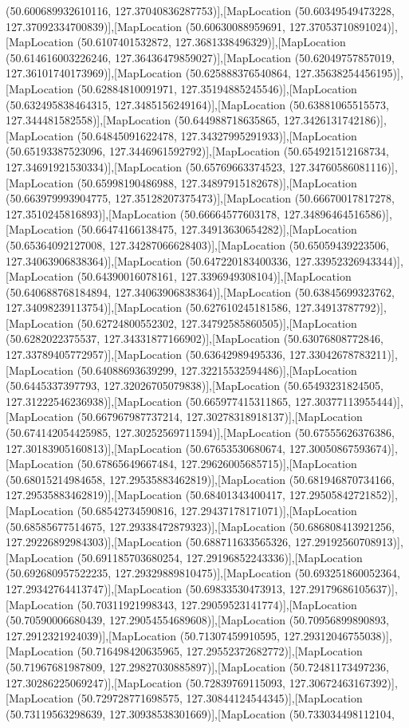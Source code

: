 (50.600689932610116, 127.37040836287753)],[MapLocation (50.60349549473228, 127.37092334700839)],[MapLocation (50.60630088959691, 127.37053710891024)],[MapLocation (50.6107401532872, 127.3681338496329)],[MapLocation (50.614616003226246, 127.36436479859027)],[MapLocation (50.62049757857019, 127.36101740173969)],[MapLocation (50.625888376540864, 127.35638254456195)],[MapLocation (50.62884810091971, 127.35194885245546)],[MapLocation (50.632495838464315, 127.3485156249164)],[MapLocation (50.63881065515573, 127.344481582558)],[MapLocation (50.644988718635865, 127.3426131742186)],[MapLocation (50.64845091622478, 127.34327995291933)],[MapLocation (50.65193387523096, 127.3446961592792)],[MapLocation (50.654921512168734, 127.34691921530334)],[MapLocation (50.65769663374523, 127.34760586081116)],[MapLocation (50.65998190486988, 127.34897915182678)],[MapLocation (50.663979993904775, 127.35128207375473)],[MapLocation (50.66670017817278, 127.3510245816893)],[MapLocation (50.66664577603178, 127.34896464516586)],[MapLocation (50.66474166138475, 127.34913630654282)],[MapLocation (50.65364092127008, 127.34287066628403)],[MapLocation (50.65059439223506, 127.34063906838364)],[MapLocation (50.647220183400336, 127.33952326943344)],[MapLocation (50.64390016078161, 127.3396949308104)],[MapLocation (50.640688768184894, 127.34063906838364)],[MapLocation (50.63845699323762, 127.34098239113754)],[MapLocation (50.627610245181586, 127.34913787792)],[MapLocation (50.62724800552302, 127.34792585860505)],[MapLocation (50.6282022375537, 127.34331877166902)],[MapLocation (50.63076808772846, 127.33789405772957)],[MapLocation (50.63642989495336, 127.33042678783211)],[MapLocation (50.64088693639299, 127.32215532594486)],[MapLocation (50.6445337397793, 127.32026705079838)],[MapLocation (50.65493231824505, 127.31222546236938)],[MapLocation (50.665977415311865, 127.30377113955444)],[MapLocation (50.667967987737214, 127.30278318918137)],[MapLocation (50.674142054425985, 127.30252569711594)],[MapLocation (50.67555626376386, 127.30183905160813)],[MapLocation (50.67653530680674, 127.30050867593674)],[MapLocation (50.67865649667484, 127.29626005685715)],[MapLocation (50.68015214984658, 127.29535883462819)],[MapLocation (50.681946870734166, 127.29535883462819)],[MapLocation (50.68401343400417, 127.29505842721852)],[MapLocation (50.68542734590816, 127.29437178171071)],[MapLocation (50.68585677514675, 127.29338472879323)],[MapLocation (50.686808413921256, 127.29226892984303)],[MapLocation (50.688711633565326, 127.29192560708913)],[MapLocation (50.691185703680254, 127.29196852243336)],[MapLocation (50.692680957522235, 127.29329889810475)],[MapLocation (50.693251860052364, 127.29342764413747)],[MapLocation (50.69833530473913, 127.29179686105637)],[MapLocation (50.70311921998343, 127.29059523141774)],[MapLocation (50.70590006680439, 127.29054554689608)],[MapLocation (50.70956899890893, 127.2912321924039)],[MapLocation (50.71307459910595, 127.29312046755038)],[MapLocation (50.716498420635965, 127.29552372682772)],[MapLocation (50.71967681987809, 127.29827030885897)],[MapLocation (50.72481173497236, 127.30286225069247)],[MapLocation (50.72839769115093, 127.30672463167392)],[MapLocation (50.729728771698575, 127.30844124544345)],[MapLocation (50.73119563298639, 127.30938538301669)],[MapLocation (50.733034498112104, 